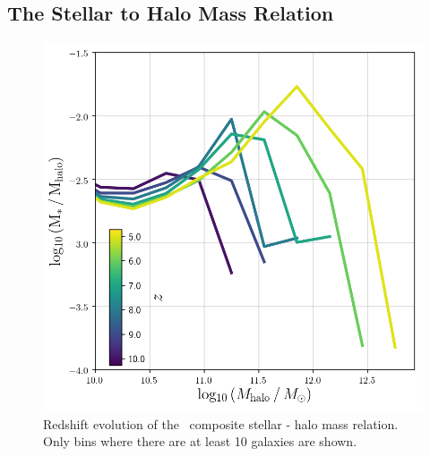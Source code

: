 



\subsection{The Stellar to Halo Mass Relation}



\begin{figure}
	\includegraphics[width=\columnwidth]{images/shmr_all.png}
    \caption{Redshift evolution of the \flares\ composite stellar - halo mass relation.
    Only bins where there are at least 10 galaxies are shown.
    }
    \label{fig:shmr_all}
\end{figure}
